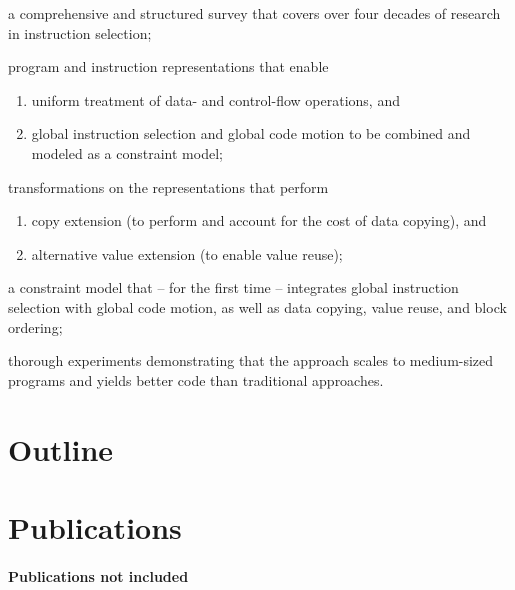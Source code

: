 \begin{contributions}
  \item a comprehensive and structured survey that covers over four decades of
    research in instruction selection;
  \item program and instruction representations that enable
    \begin{enumerate}[label=\alph*)]
      \item uniform treatment of data- and control-flow operations, and
      \item global instruction selection and global code motion to be combined
        and modeled as a constraint model;
    \end{enumerate}
  \item transformations on the representations that perform
    \begin{enumerate}[label=\alph*)]
      \item copy extension (to perform and account for the cost of data
        copying), and
      \item alternative value extension (to enable value reuse);
    \end{enumerate}
  \item a constraint model that -- for the first time -- integrates global
    instruction selection with global code motion, as well as data copying,
    value reuse, and block ordering;
  \item thorough experiments demonstrating that the approach scales to
    medium-sized programs and yields better code than traditional approaches.
\end{contributions}


\section{Outline}


\section{Publications}


\paragraph{Publications not included}

